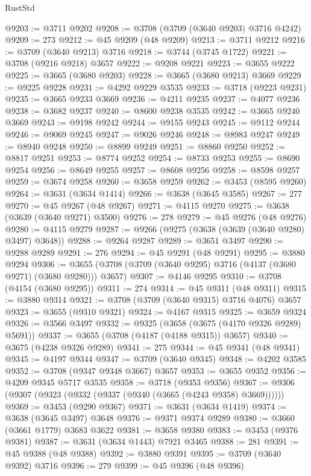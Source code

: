 \begin{lexlean}{RustStd}
\begin{coremodule}
@9203 := @3711 @9202
@9208 := @3708 (@3709 (@3640 @9203) @3716 @4242)
@9209 := 273
@9212 := @45 @9209 (@48 @9209)
@9213 := @3711 @9212
@9216 := @3709 (@3640 @9213) @3716
@9218 := @3744 (@3745 @1722)
@9221 := @3708 (@9216 @9218) @3657
@9222 := @9208 @9221
@9223 := @3655 @9222
@9225 := @3665 (@3680 @9203)
@9228 := @3665 (@3680 @9213) @3669
@9229 := @9225 @9228
@9231 := @4292 @9229 @3535
@9233 := @3718 (@9223 @9231)
@9235 := @3665 @9233 @3669
@9236 := @4211 @9235
@9237 := @4077 @9236
@9238 := @3682 @9237
@9240 := @8600 @9238 @3535
@9242 := @3665 @9240 @3669
@9243 := @9198 @9242
@9244 := @9155 @9243
@9245 := @9112 @9244
@9246 := @9069 @9245
@9247 := @9026 @9246
@9248 := @8983 @9247
@9249 := @8940 @9248
@9250 := @8899 @9249
@9251 := @8860 @9250
@9252 := @8817 @9251
@9253 := @8774 @9252
@9254 := @8733 @9253
@9255 := @8690 @9254
@9256 := @8649 @9255
@9257 := @8608 @9256
@9258 := @8598 @9257
@9259 := @3674 @9258
@9260 := @3658 @9259
@9262 := @3453 (@8595 @9260)
@9264 := @3631 (@3634 @1414)
@9266 := @3638 (@3645 @3585)
@9267 := 277
@9270 := @45 @9267 (@48 @9267)
@9271 := @4115 @9270
@9275 := @3638 (@3639 (@3640 @9271) @3500)
@9276 := 278
@9279 := @45 @9276 (@48 @9276)
@9280 := @4115 @9279
@9287 := @9266 (@9275 (@3638 (@3639 (@3640 @9280) @3497) @3648))
@9288 := @9264 @9287
@9289 := @3651 @3497
@9290 := @9288 @9289
@9291 := 276
@9294 := @45 @9291 (@48 @9291)
@9295 := @3880 @9294
@9306 := @3655 (@3708 (@3709 (@3640 @9295) @3716 (@4137 (@3680 @9271) (@3680 @9280))) @3657)
@9307 := @4146 @9295
@9310 := @3708 (@4154 (@3680 @9295))
@9311 := 274
@9314 := @45 @9311 (@48 @9311)
@9315 := @3880 @9314
@9321 := @3708 (@3709 (@3640 @9315) @3716 @4076) @3657
@9323 := @3655 (@9310 @9321)
@9324 := @4167 @9315
@9325 := @3659 @9324
@9326 := @3566 @3497
@9332 := @9325 (@3658 (@3675 (@4170 @9326 @9289) @5691))
@9337 := @3655 (@3708 (@4187 (@4188 @9315)) @3657)
@9340 := @3675 (@4238 @9326 @9289)
@9341 := 275
@9344 := @45 @9341 (@48 @9341)
@9345 := @4197 @9344
@9347 := @3709 (@3640 @9345)
@9348 := @4202 @3585
@9352 := @3708 (@9347 @9348 @3667) @3657
@9353 := @3655 @9352
@9356 := @4209 @9345 @5717 @3535
@9358 := @3718 (@9353 @9356)
@9367 := @9306 (@9307 (@9323 (@9332 (@9337 (@9340 (@3665 (@4243 @9358) @3669))))))
@9369 := @3453 (@9290 @9367)
@9371 := @3631 (@3634 @1419)
@9374 := @3638 (@3645 @3497) @3648
@9376 := @9371 @9374 @9289
@9380 := @3660 (@3661 @1779) @3683 @3622
@9381 := @3658 @9380
@9383 := @3453 (@9376 @9381)
@9387 := @3631 (@3634 @1443) @7921 @3465
@9388 := 281
@9391 := @45 @9388 (@48 @9388)
@9392 := @3880 @9391
@9395 := @3709 (@3640 @9392) @3716
@9396 := 279
@9399 := @45 @9396 (@48 @9396)

\end{coremodule}
\end{lexlean}
